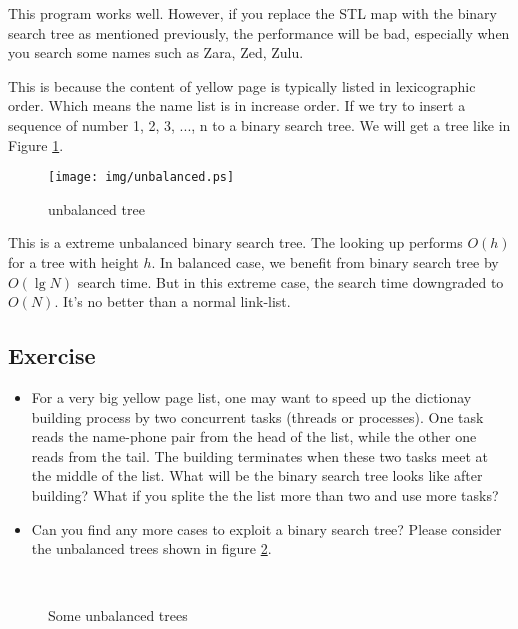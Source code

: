 \documentclass{article}
\begin{document}
This program works well. However, if you replace the STL map 
with the binary search tree as mentioned previously, the 
performance will be bad, especially when you search some names such
as Zara, Zed, Zulu.

This is because the content of yellow page is typically listed
in lexicographic order. Which means the name list is in increase
order. If we try to insert a sequence of number 1, 2, 3, ..., n 
to a binary search tree. We will get a tree like in Figure \ref{fig:unbalanced-tree}.

\begin{figure}[htbp]
       \centering
	\texttt{[image: img/unbalanced.ps]}
        \caption{unbalanced tree} \label{fig:unbalanced-tree}
\end{figure}

This is a extreme unbalanced binary search tree. The looking up performs
$O(h)$ for a tree with height $h$. In balanced case, we benefit from 
binary search tree by $O(\lg N)$ search time. But in this extreme case, 
the search time downgraded to $O(N)$. It's no better than a normal link-list.

\subsection*{Exercise}

\begin{itemize}
\item For a very big yellow page list, one may want to speed up the
dictionay building process by two concurrent tasks (threads or processes).
One task reads the name-phone pair from the head of the list, while the
other one reads from the tail. The building terminates when these
two tasks meet at the middle of the list. What will be the binary
search tree looks like after building? What if you splite the the
list more than two and use more tasks?

\item Can you find any more cases to exploit a binary search tree?
Please consider the unbalanced trees shown in figure 
\ref{fig:unbalanced-trees}.
\end{itemize}

\begin{figure}[htbp]
       \centering
        \\
       \caption{Some unbalanced trees} 
       \label{fig:unbalanced-trees}
\end{figure}
\end{document}
